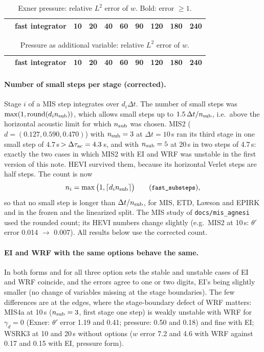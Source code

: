\documentclass[11pt,a4paper]{article}
\newcommand{\dtau}{\Delta\tau}
\newcommand{\code}[1]{\texttt{\small #1}}
\begin{document}
\begin{table}[ht]\centering\footnotesize
\caption{Exner pressure: relative $L^2$ error of $w$. Bold: error $\ge1$.}\label{tab:w}
\begin{tabular}{llcccccccc}\toprule
&fast integrator & 10 & 20 & 40 & 60 & 90 & 120 & 180 & 240\\\midrule

\bottomrule\end{tabular}
\end{table}

\begin{table}[ht]\centering\footnotesize
\caption{Pressure as additional variable: relative $L^2$ error of $w$.}\label{tab:wp}
\begin{tabular}{llcccccccc}\toprule
&fast integrator & 10 & 20 & 40 & 60 & 90 & 120 & 180 & 240\\\midrule

\bottomrule\end{tabular}
\end{table}

\paragraph{Number of small steps per stage (corrected).} Stage $i$ of a MIS step integrates over $d_i\Delta t$.
The number of small steps was $\max(1,\mathrm{round}(d_in_{\rm sub}))$, which allows small steps up to
$1.5\,\Delta t/n_{\rm sub}$, i.e.\ above the horizontal acoustic limit for which $n_{\rm sub}$ was chosen. MIS2
($d=(0.127,0.590,0.470)$) with $n_{\rm sub}=3$ at $\Delta t=10$\,s ran its third stage in one small step of
$4.7\,$s$\,>\dtau_{\rm ac}=4.3$\,s, and with $n_{\rm sub}=5$ at 20\,s in two steps of 4.7\,s: exactly the two cases in
which MIS2 with EI and WRF was unstable in the first version of this note. HEVI survived them, because its
horizontal Verlet steps are half steps. The count is now
\[
n_i=\max\big(1,\lceil d_in_{\rm sub}\rceil\big)\qquad(\code{fast\_substeps}),
\]
so that no small step is longer than $\Delta t/n_{\rm sub}$, for MIS, ETD, Lawson and EPIRK and in the frozen and
the linearized split. The MIS study of \code{docs/mis\_agnesi} used the rounded count; its HEVI
numbers change slightly (e.g.\ MIS2 at 10\,s: $\theta'$ error 0.014 $\to$ 0.007). All results below use
the corrected count.

\paragraph{EI and WRF with the same options behave the same.} In both forms and for all three option
sets the stable and unstable cases of EI and WRF coincide, and the errors agree to one or two digits,
EI's being slightly smaller (no change of variables missing at the stage boundaries). The few
differences are at the edges, where the stage-boundary defect of WRF matters: MIS4a at 10\,s
($n_{\rm sub}=3$, first stage one step) is weakly unstable with WRF for $\gamma_d=0$ (Exner: $\theta'$ error 1.19 and 0.41;
pressure: 0.50 and 0.18) and fine with EI; WSRK3 at 10 and 20\,s without options ($w$ error 7.2 and 4.6 with
WRF against 0.17 and 0.15 with EI, pressure form).
\end{document}

